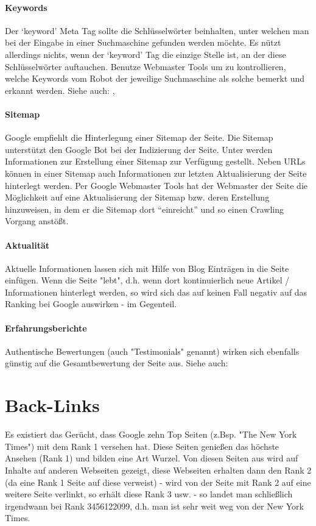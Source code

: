 \documentclass[ngerman, 12pt, a4paper]{scrartcl}
\begin{document}
\paragraph{Keywords}
Der `keyword' Meta Tag sollte die Schlüsselwörter beinhalten, unter welchen man bei der Eingabe in
einer Suchmaschine gefunden werden möchte. Es nützt allerdings nichts, wenn der `keyword' Tag die
einzige Stelle ist, an der diese Schlüsselwörter auftauchen. Benutze Webmaster Tools um zu kontrollieren,
welche Keywords vom Robot der jeweilige Suchmaschine als solche bemerkt und erkannt werden.
\newline Siehe auch: \cite{google_webmaster}, \cite{meta_tags}

\paragraph{Sitemap}
Google empfiehlt die Hinterlegung einer Sitemap der Seite. Die Sitemap unterstützt den Google Bot
bei der Indizierung der Seite. Unter \cite{sitemap} werden Informationen zur Erstellung einer Sitemap
zur Verfügung gestellt. Neben URLs können in einer Sitemap auch Informationen zur letzten Aktualisierung
der Seite hinterlegt werden. Per Google Webmaster Tools hat der Webmaster der Seite die Möglichkeit
auf eine Aktualisierung der Sitemap bzw. deren Erstellung hinzuweisen, in dem er die Sitemap dort
``einreicht'' und so einen Crawling Vorgang anstößt.

\paragraph{Aktualität}
Aktuelle Informationen lassen sich mit Hilfe von Blog Einträgen in die Seite einfügen.
Wenn die Seite "lebt", d.h. wenn dort kontinuierlich neue Artikel / Informationen hinterlegt werden,
so wird sich das auf keinen Fall negativ auf das Ranking bei Google auswirken - im Gegenteil.

\paragraph{Erfahrungsberichte}
Authentische Bewertungen (auch "Testimonials" genannt) wirken sich ebenfalls günstig auf die
Gesamtbewertung der Seite aus. Siehe auch:  \cite{testimonial}


\section*{Back-Links}
Es existiert das Gerücht, dass Google zehn Top Seiten (z.Bsp. "The New York Times") mit dem Rank 1
versehen hat. Diese Seiten genießen das höchste Ansehen (Rank 1) und bilden eine Art Wurzel. Von
diesen Seiten aus wird auf Inhalte auf anderen Webseiten gezeigt, diese Webseiten erhalten dann den
Rank 2 (da eine Rank 1 Seite auf diese verweist) - wird von der Seite mit Rank 2 auf eine weitere
Seite verlinkt, so erhält diese Rank 3 usw. - so landet man schließlich irgendwann bei
Rank 3456122099, d.h. man ist sehr weit weg von der New York Times.
\end{document}
